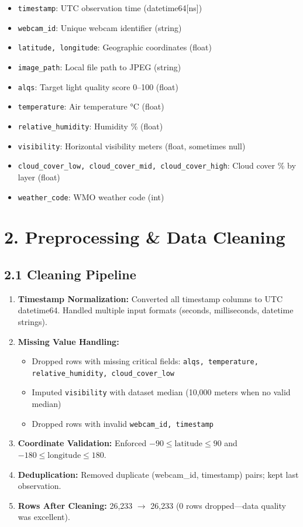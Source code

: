 \documentclass[11pt,a4paper]{article}
\begin{document}
\begin{itemize}
    \item \texttt{timestamp}: UTC observation time (datetime64[ns])
    \item \texttt{webcam\_id}: Unique webcam identifier (string)
    \item \texttt{latitude, longitude}: Geographic coordinates (float)
    \item \texttt{image\_path}: Local file path to JPEG (string)
    \item \texttt{alqs}: Target light quality score 0--100 (float)
    \item \texttt{temperature}: Air temperature °C (float)
    \item \texttt{relative\_humidity}: Humidity \% (float)
    \item \texttt{visibility}: Horizontal visibility meters (float, sometimes null)
    \item \texttt{cloud\_cover\_low, cloud\_cover\_mid, cloud\_cover\_high}: Cloud cover \% by layer (float)
    \item \texttt{weather\_code}: WMO weather code (int)
\end{itemize}

\section{2. Preprocessing \& Data Cleaning}

\subsection{2.1 Cleaning Pipeline}

\begin{enumerate}
    \item \textbf{Timestamp Normalization:} Converted all timestamp columns to UTC datetime64. Handled multiple input formats (seconds, milliseconds, datetime strings).
    
    \item \textbf{Missing Value Handling:}
    \begin{itemize}
        \item Dropped rows with missing critical fields: \texttt{alqs, temperature, relative\_humidity, cloud\_cover\_low}
        \item Imputed \texttt{visibility} with dataset median (10,000 meters when no valid median)
        \item Dropped rows with invalid \texttt{webcam\_id, timestamp}
    \end{itemize}
    
    \item \textbf{Coordinate Validation:} Enforced $-90 \leq \text{latitude} \leq 90$ and $-180 \leq \text{longitude} \leq 180$.
    
    \item \textbf{Deduplication:} Removed duplicate (webcam\_id, timestamp) pairs; kept last observation.
    
    \item \textbf{Rows After Cleaning:} 26,233 $\rightarrow$ 26,233 (0 rows dropped---data quality was excellent).
\end{enumerate}
\end{document}
